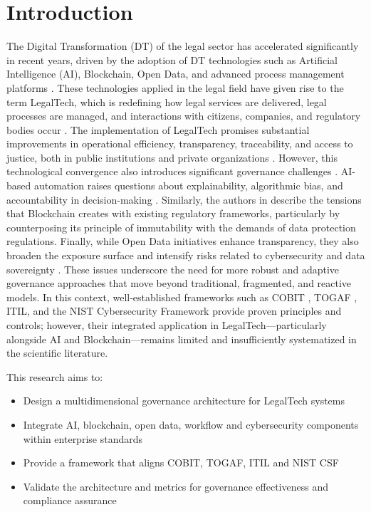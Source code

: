 \documentclass{IET-Conf-Paper}
\begin{document}
\section{Introduction}
    The Digital Transformation (DT) of the legal sector has accelerated significantly in recent years, driven by the adoption of DT technologies such as Artificial Intelligence (AI), Blockchain, Open Data, and advanced process management platforms \cite{tikhomirov2021law,kirvsiene2022digital,11238283}.
    These technologies applied in the legal field have given rise to the term LegalTech, which is redefining how legal services are delivered, legal processes are managed, and interactions with citizens, companies, and regulatory bodies occur \cite{whalen2022defining,sacoto2025iot,hartung2017legal}.
    The implementation of LegalTech promises substantial improvements in operational efficiency, transparency, traceability, and access to justice, both in public institutions and private organizations \cite{webb2022legal}.
    However, this technological convergence also introduces significant governance challenges \cite{khan2022systematic}.
    AI-based automation raises questions about explainability, algorithmic bias, and accountability in decision-making \cite{patidar2024transparency}.
    Similarly, the authors in \cite{karisma2023blockchain} describe the tensions that Blockchain creates with existing regulatory frameworks, particularly by counterposing its principle of immutability with the demands of data protection regulations.
    Finally, while Open Data initiatives enhance transparency, they also broaden the exposure surface and intensify risks related to cybersecurity and data sovereignty \cite{carter2024digital}. These issues underscore the need for more robust and adaptive governance approaches that move beyond traditional, fragmented, and reactive models. In this context, well‑established frameworks such as COBIT \cite{rusman2022information}, TOGAF \cite{puspitasari2021enterprise}, ITIL, and the NIST Cybersecurity Framework provide proven principles and controls; however, their integrated application in LegalTech—particularly alongside AI and Blockchain—remains limited and insufficiently systematized in the scientific literature.
    
    This research aims to:
    \begin{itemize}
    \item Design a multidimensional governance architecture for LegalTech systems
    \item Integrate AI, blockchain, open data, workflow and cybersecurity components within enterprise standards
    \item Provide a framework that aligns COBIT, TOGAF, ITIL and NIST CSF
    \item Validate the architecture and metrics for governance effectiveness and compliance assurance
    \end{itemize}
\end{document}
